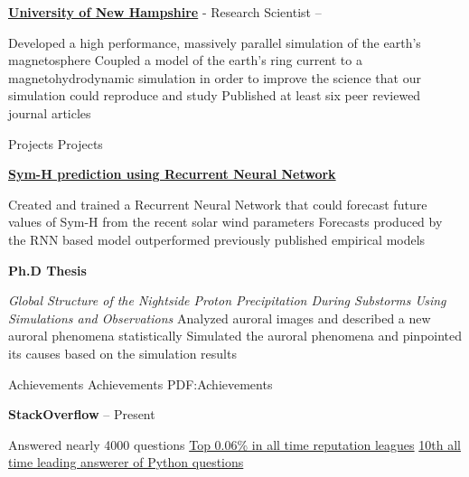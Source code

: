 \documentclass[letterpaper,MMMyyyy,nonstopmode]{simpleresumecv}
\begin{document}
\begin{Body}
\BigGap
\Entry
\href {http://www.unh.edu/}{\textbf{University of New Hampshire}}
-
Research Scientist
\hfill
{} -- 

\Gap
\begin{Detail}
\BulletItem
Developed a high performance, massively parallel simulation of the earth's magnetosphere
\BulletItem
Coupled a model of the earth's ring current to a magnetohydrodynamic simulation in order to improve the science that our simulation could reproduce and study
\BulletItem
Published at least six peer reviewed journal articles
\end{Detail}



\Section
{Projects}
{Projects}
{}

\Entry
\href{https://github.com/mgilson/symH-predict}{\textbf{Sym-H prediction using Recurrent Neural Network}}
\hfill
{}

\Gap
\begin{Detail}
\BulletItem
Created and trained a Recurrent Neural Network that could forecast future values
of Sym-H from the recent solar wind parameters
\BulletItem
Forecasts produced by the RNN based model outperformed previously published empirical models
\end{Detail}

\BigGap


\Entry
\textbf{Ph.D Thesis}
\hfill
{}
\Gap
\begin{Detail}
\BulletItem
\textit{Global Structure of the Nightside Proton Precipitation During Substorms Using Simulations and Observations}
\BulletItem
Analyzed auroral images and described a new auroral phenomena statistically
\BulletItem
Simulated the auroral phenomena and pinpointed its causes based on the simulation results
\end{Detail}



\Section
{Achievements}
{Achievements}
{PDF:Achievements}

\Entry
\textbf{StackOverflow}
\hfill
{} -- Present
\begin{Detail}
\BulletItem
Answered nearly 4000 questions
\BulletItem
\href{http://stackoverflow.com/cv/matthew-gilson-428809}{Top 0.06\% in all time reputation leagues}
\BulletItem
\href{http://stackoverflow.com/tags/python/topusers}{10th all time leading answerer of Python questions}
\end{Detail}



\end{Body}
\end{document}
